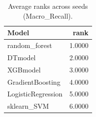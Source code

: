 \begin{table}[t]
\centering
\begin{tabular}{lr}
\toprule
Model & rank \\
\midrule
random_forest & 1.0000 \\
DTmodel & 2.0000 \\
XGBmodel & 3.0000 \\
GradientBoosting & 4.0000 \\
LogisticRegression & 5.0000 \\
sklearn_SVM & 6.0000 \\
\bottomrule
\end{tabular}
\caption{Average ranks across seeds (Macro_Recall).}
\label{tab:avg_rank_Macro_Recall}
\end{table}